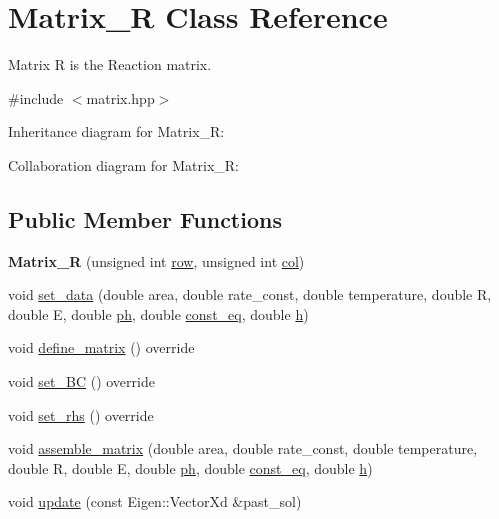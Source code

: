 \hypertarget{classMatrix__R}{}\section{Matrix\+\_\+R Class Reference}
\label{classMatrix__R}


Matrix R is the Reaction matrix.  




{\ttfamily \#include $<$matrix.\+hpp$>$}



Inheritance diagram for Matrix\+\_\+R\+:


Collaboration diagram for Matrix\+\_\+R\+:
\subsection*{Public Member Functions}
\begin{DoxyCompactItemize}
\item 
\mbox{\label{classMatrix__R_af03976837635a34f0d1b9ea585fda9fc}} 
{\bfseries Matrix\+\_\+R} (unsigned int \hyperlink{classAbstractMatrix_a27fb46bf2853d4927d92a81b8b7773fb}{row}, unsigned int \hyperlink{classAbstractMatrix_af3ad3551ce094979488cef5df0e4fc1d}{col})
\item 
void \hyperlink{classMatrix__R_ae3f3ac08d895f527362542dd3b288d62}{set\+\_\+data} (double area, double rate\+\_\+const, double temperature, double R, double E, double \hyperlink{classMatrix__R_ae8345433c06d0d0249c09783c4ff80bc}{ph}, double \hyperlink{classMatrix__R_ab5ca8aff010e279569065f76d28c4437}{const\+\_\+eq}, double \hyperlink{classMatrix__R_ac5bb79872f4324d89760f8047a1e63a4}{h})
\item 
void \hyperlink{classMatrix__R_a311aefa7be3bbb741d1958e840bc4613}{define\+\_\+matrix} () override
\item 
void \hyperlink{classMatrix__R_a33b829a44256d8d363891f3fc3d58244}{set\+\_\+\+BC} () override
\item 
void \hyperlink{classMatrix__R_a6305da2e94b8841f14061f3ad1ed9464}{set\+\_\+rhs} () override
\item 
void \hyperlink{classMatrix__R_ae09d3c9f7420ecec1f61313a78cd1ce9}{assemble\+\_\+matrix} (double area, double rate\+\_\+const, double temperature, double R, double E, double \hyperlink{classMatrix__R_ae8345433c06d0d0249c09783c4ff80bc}{ph}, double \hyperlink{classMatrix__R_ab5ca8aff010e279569065f76d28c4437}{const\+\_\+eq}, double \hyperlink{classMatrix__R_ac5bb79872f4324d89760f8047a1e63a4}{h})
\item 
void \hyperlink{classMatrix__R_ab896dfe91327ba364fdcaab15e7f2547}{update} (const Eigen\+::\+Vector\+Xd \&past\+\_\+sol)
\end{DoxyCompactItemize}
